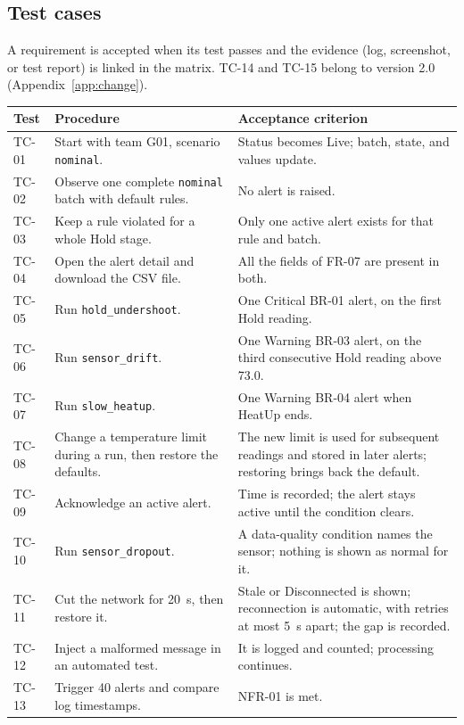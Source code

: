 \documentclass[10pt,a4paper]{article}
\renewcommand{\arraystretch}{1.25}
\newcommand{\head}[1]{\textbf{\color{courseblue}#1}}
\newcommand{\field}[1]{\texttt{#1}}
\begin{document}
\subsection{Test cases}
A requirement is accepted when its test passes and the evidence (log, screenshot, or test report) is linked in the matrix. TC-14 and TC-15 belong to version 2.0 (Appendix~\ref{app:change}).

{\renewcommand{\arraystretch}{1.08}
\begin{longtable}{@{}L{14mm}L{67mm}L{72mm}@{}}
\toprule \head{Test} & \head{Procedure} & \head{Acceptance criterion}\\ \midrule \endhead
TC-01 & Start with team G01, scenario \field{nominal}. & Status becomes Live; batch, state, and values update.\\
TC-02 & Observe one complete \field{nominal} batch with default rules. & No alert is raised.\\
TC-03 & Keep a rule violated for a whole Hold stage. & Only one active alert exists for that rule and batch.\\
TC-04 & Open the alert detail and download the CSV file. & All the fields of FR-07 are present in both.\\
TC-05 & Run \field{hold\_undershoot}. & One Critical BR-01 alert, on the first Hold reading.\\
TC-06 & Run \field{sensor\_drift}. & One Warning BR-03 alert, on the third consecutive Hold reading above 73.0.\\
TC-07 & Run \field{slow\_heatup}. & One Warning BR-04 alert when HeatUp ends.\\
TC-08 & Change a temperature limit during a run, then restore the defaults. & The new limit is used for subsequent readings and stored in later alerts; restoring brings back the default.\\
TC-09 & Acknowledge an active alert. & Time is recorded; the alert stays active until the condition clears.\\
TC-10 & Run \field{sensor\_dropout}. & A data-quality condition names the sensor; nothing is shown as normal for it.\\
TC-11 & Cut the network for 20~s, then restore it. & Stale or Disconnected is shown; reconnection is automatic, with retries at most 5~s apart; the gap is recorded.\\
TC-12 & Inject a malformed message in an automated test. & It is logged and counted; processing continues.\\
TC-13 & Trigger 40 alerts and compare log timestamps. & NFR-01 is met.\\

\end{longtable}}
\end{document}

